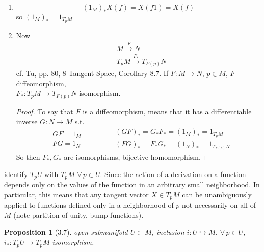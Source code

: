 \documentclass[11pt]{amsart}
\newtheorem{proposition}{Proposition}
\theoremstyle{definition}
\begin{document}
\begin{enumerate}
$\begin{aligned} & \quad \\
  & GF : M \to P \\
  & (GF)_*: T_pM \to T_{GF(p)}P \end{aligned}$.  $h\in C^{\infty}P$

Now consider

\[
G_* (F_*X)(h) = F_* X(hG) = X(hGF)\Longrightarrow G_* F_* = (GF)_*
\]

\item[(c)] \[
(1_M)_* X(f) = X(f1) = X(f)
\]
so $(1_M)_* = 1_{T_pM }$
\item[(d)]
Now
\[
\begin{aligned}
  & M \xrightarrow{F} N \\
  & T_pM \xrightarrow{ F_*} T_{F(p)}N
\end{aligned}
\]
cf. Tu, pp. 80, 8 Tangent Space, Corollary 8.7.  If $F: M \to N$, $p\in M$, $F$ diffeomorphism, \\
\phantom{cf. Tu, pp. 80, 8 Tangent Space, Corollary 8.7. } $F_*: T_p M \to T_{F(p)}N$ isomorphism.

\begin{proof}
  To say that $F$ is a diffeomorphism, means that it has a differentiable inverse $G: N \to M$ s.t.
\[
\begin{aligned}
  & GF = 1_M \\
  & FG = 1_N
\end{aligned} \quad \quad \quad \,
 \begin{aligned}
   & (GF)_* = G_* F_* = (1_M)_* = 1_{T_pM} \\
   & (FG)_* = F_* G_* = (1_N)_* = 1_{T_{F(p)}N}
\end{aligned}
\]
So then $F_*, G_*$ are isomorphisms, bijective homomorphism.
\end{proof}
\end{enumerate}


identify $T_pU$ with $T_pM$ $\forall \, p \in U$.   Since the action of a derivation on a function depends only on the values of the function in an arbitrary small neighborhood.
In particular, this means that any tangent vector $X \in T_pM$ can be unambiguously applied to functions defined only in a neighborhood of $p$ not necessarily on all of $M$ (note partition of unity, bump functions).

\begin{proposition}[3.7] open submanifold $U \subset M$, inclusion $i: U \hookrightarrow M$.  $\forall \, p \in U$, $i_* : T_pU \to T_p M$ isomorphism. \end{proposition}
\end{document}
